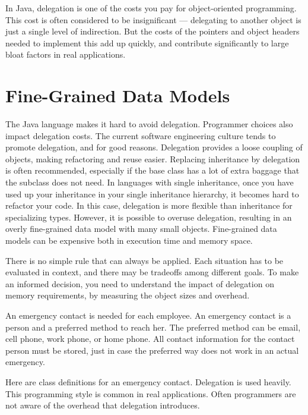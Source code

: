 In Java, delegation is one of the costs you pay for object-oriented programming. This cost is often considered to be insignificant --- delegating to another object is just a single level of indirection. But the costs of the pointers and object headers needed to implement this add up quickly, and contribute significantly to large bloat factors in real applications.

\section{Fine-Grained Data Models}
\label{fine-grained-data-models}

The Java language makes it hard to avoid delegation. Programmer choices also impact delegation costs.  The current software engineering culture tends to promote delegation, and for good reasons. Delegation provides a loose coupling of objects, making refactoring and reuse easier. Replacing inheritance by delegation is often recommended, especially if the base class has a lot of extra baggage that the subclass does not need. In languages with single inheritance, once you have used up your inheritance in your single inheritance hierarchy, it becomes hard to refactor your code. In this case, delegation is more flexible than inheritance for specializing types. However, it is possible to overuse delegation, resulting in an overly fine-grained data model with many small objects. Fine-grained data models can be expensive both in execution time and memory space. 

There is no simple rule that can always be applied. Each situation has to be evaluated in context, and there may be tradeoffs among different goals. To make an informed decision, you need to understand the impact of delegation on memory requirements, by measuring the object sizes and overhead.  

 
\begin{example} 
An emergency contact is needed for each employee. An emergency contact is a person and a preferred method to reach her.  The preferred method can be email, cell phone, work phone, or home phone. All contact information for the contact person must be stored, just in case the preferred way does not work in an actual emergency. 
\end{example}
Here are class definitions for an emergency contact. Delegation is used heavily. This programming style is common in real applications. Often programmers are not aware of the overhead that delegation introduces. 

